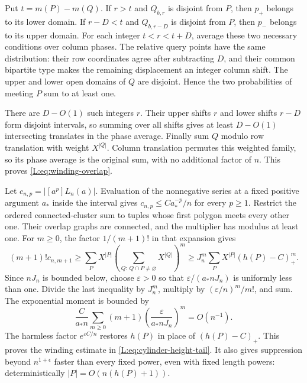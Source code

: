 \documentclass[11pt]{article}
\numberwithin{equation}{section}
\theoremstyle{definition}\newtheorem{definition}[theorem]{Definition}
\theoremstyle{remark}\newtheorem{remark}[theorem]{Remark}
\begin{document}
Put $t=m(P)-m(Q)$. If $r>t$ and $Q_{b,r}$ is disjoint from $P$, then
$p_+$ belongs to its lower domain. If $r-D<t$ and $Q_{b,r-D}$ is
disjoint from $P$, then $p_-$ belongs to its upper domain. For each
integer $t<r<t+D$, average these two necessary conditions over column
phases. The relative query points have the same distribution: their
row coordinates agree after subtracting $D$, and their common bipartite
type makes the remaining displacement an integer column shift. The
upper and lower open domains of $Q$ are disjoint. Hence the two
probabilities of meeting $P$ sum to at least one.

There are $D-O(1)$ such integers $r$. Their upper shifts $r$ and lower
shifts $r-D$ form disjoint intervals, so summing over all shifts gives
at least $D-O(1)$ intersecting translates in the phase average. Finally
sum $Q$ modulo row translation with weight $X^{|Q|}$. Column translation
permutes this weighted family, so its phase average is the original
sum, with no additional factor of $n$. This proves
\eqref{L:eq:winding-overlap}.

Let $c_{n,p}=|[a^p]L_n(a)|$. Evaluation of the nonnegative series at a
fixed positive argument $a_*$ inside the interval gives
$c_{n,p}\le C a_*^{-p}/n$ for every $p\ge1$. Restrict the ordered
connected-cluster sum to tuples whose first polygon meets every other
one. Their overlap graphs are connected, and the multiplier has modulus
at least one. For $m\ge0$, the factor $1/(m+1)!$ in that expansion gives
\[
 (m+1)!c_{n,m+1}
 \ge\sum_PX^{|P|}
       \left(\sum_{Q:\,Q\cap P\ne\varnothing}X^{|Q|}\right)^m
 \ge J_n^m\sum_PX^{|P|}(h(P)-C)_+^m.
\]
Since $nJ_n$ is bounded below, choose $\varepsilon>0$ so that
$\varepsilon/(a_*nJ_n)$ is uniformly less than one. Divide the last
inequality by $J_n^m$, multiply by $(\varepsilon/n)^m/m!$, and sum.
The exponential moment is bounded by
\[
 \frac{C}{a_*n}\sum_{m\ge0}(m+1)
      \left(\frac{\varepsilon}{a_*nJ_n}\right)^m=O(n^{-1}).
\]
The harmless factor $e^{\varepsilon C/n}$ restores $h(P)$ in place of
$(h(P)-C)_+$. This proves the winding estimate in
\eqref{L:eq:cylinder-height-tail}. It also gives suppression beyond
$n^{1+\epsilon}$ faster than every fixed power, even with fixed length
powers: deterministically $|P|=O(n(h(P)+1))$.
\end{document}
